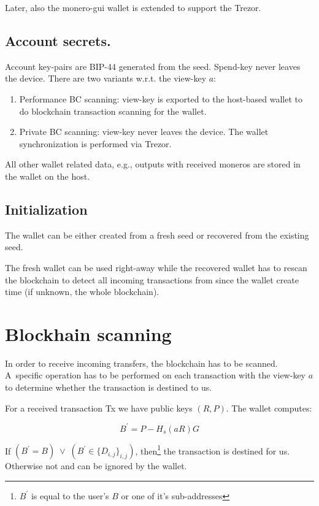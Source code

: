 \documentclass[]{article}
\begin{document}
Later, also the monero-gui wallet is extended to support the Trezor.

\subsection{Account secrets.}
Account key-pairs are BIP-44 generated from the seed. Spend-key never leaves the device. There are two variants w.r.t. the view-key $a$:

\begin{enumerate}
	\item Performance BC scanning: view-key is exported to the host-based wallet to do blockchain transaction scanning for the wallet.
	\item Private BC scanning: view-key never leaves the device. The wallet synchronization is performed via Trezor. 
\end{enumerate}

All other wallet related data, e.g., outputs with received moneros are
stored in the wallet on the host.

\subsection{Initialization} 
The wallet can be either created from a fresh seed or recovered from the existing seed.

The fresh wallet can be used right-away while the recovered wallet has to rescan the blockchain to detect all incoming transactions from since the wallet create time (if unknown, the whole blockchain).

\section{Blockhain scanning}

In order to receive incoming transfers, the blockchain has to be scanned. A~specific operation has to be performed on each transaction with the view-key $a$ to determine whether the transaction is destined to us.

For a received transaction Tx we have public keys $\left(R, P\right)$.
The wallet computes: 

\begin{equation}
B^\prime = P - H_s(aR)G
\end{equation}


If $\left(B^\prime = B\right) \; \vee \; \left(B^\prime \in \{D_{i,j}\}_{i,j}\right)$, then\footnote{$B^\prime$ is equal to the user's $B$ or one of it's sub-addresses} the transaction is destined for us. Otherwise not and can be ignored by the wallet.
\end{document}
